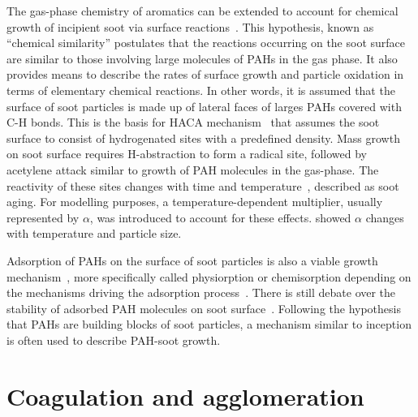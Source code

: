 The gas-phase chemistry of aromatics can be extended to account for chemical growth of incipient soot via surface reactions~\citep{frenklach2002reaction}. This hypothesis, known as “chemical similarity” postulates that the reactions occurring on the soot surface are similar to those involving large molecules of PAHs in the gas phase. It also provides means to describe the rates of surface growth and particle oxidation in
terms of elementary chemical reactions. In other words, it is assumed that the surface of soot particles is made up of lateral faces of larges PAHs covered with C-H bonds.
This is the basis for HACA mechanism~\citep{frenklach1991detailed, appel2000kinetic}  that assumes the soot surface to consist of hydrogenated sites with a predefined density. Mass growth on soot surface requires H-abstraction to form a radical
site, followed by acetylene attack similar to growth of PAH molecules in the gas-phase. The reactivity of these sites changes with time and temperature~\citep{woods1991soot, dasch1985decay}, described as soot aging. For modelling purposes, a temperature-dependent multiplier, usually represented by $\alpha$, was introduced to account for these effects. \citet{appel2000kinetic} showed $\alpha$ changes with temperature and particle size.


Adsorption of PAHs on the surface of soot particles is also a viable growth mechanism~\citep{frenklach1991detailed}, more specifically called physiorption or chemisorption depending on the mechanisms driving the adsorption process~\citep{michelsen2020review}. There is still debate over the stability of adsorbed PAH molecules on soot surface~\citep{obolensky2007interplay}. Following the hypothesis that PAHs are building blocks of soot particles, a mechanism similar to inception is often used to describe  PAH-soot growth.

\section{Coagulation and agglomeration}

